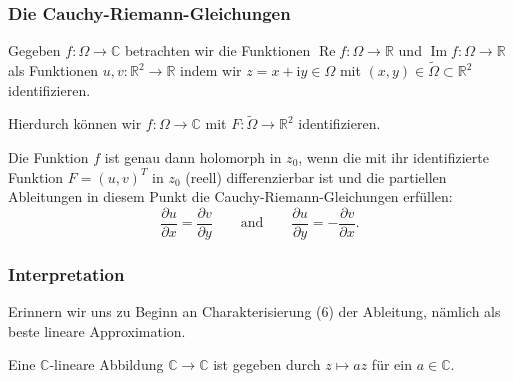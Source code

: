 \documentclass[10pt]{beamer}
\newcommand{\iu}{\mathrm{i}}
\renewcommand{\Re}{\operatorname{Re}}
\renewcommand{\Im}{\operatorname{Im}}
\begin{document}
\begin{frame}
	\frametitle{Die Cauchy-Riemann-Gleichungen}
	Gegeben $f \colon \Omega \to \mathbb{C}$ betrachten wir die Funktionen $\Re f \colon \Omega \to \mathbb{R}$ und $\Im f \colon \Omega \to \mathbb{R}$ als Funktionen $u, v \colon \mathbb{R}^2 \to \mathbb{R}$ indem wir $z = x + \iu y \in \Omega$ mit $(x, y) \in \tilde{\Omega} \subset \mathbb{R}^2$ identifizieren.
	\pause

	Hierdurch können wir $f \colon \Omega \to \mathbb{C}$ mit $F \colon \tilde{\Omega} \to \mathbb{R}^2$ identifizieren.
	\pause
	\begin{theorem}
		Die Funktion $f$ ist genau dann holomorph in $z_0$, wenn die mit ihr identifizierte Funktion $F = (u, v)^T$ in $z_0$ (reell) differenzierbar ist und die partiellen Ableitungen in diesem Punkt die Cauchy-Riemann-Gleichungen erfüllen:
		\[
			\frac{\partial u}{\partial x} = \frac{\partial v}{\partial y} \qquad \text{and} \qquad \frac{\partial u}{\partial y} = - \frac{\partial v}{\partial x}.
		\]
	\end{theorem}
\end{frame}
\begin{frame}
	\frametitle{Interpretation}
	Erinnern wir uns zu Beginn an Charakterisierung (6) der Ableitung, nämlich als beste lineare Approximation.
	\pause

	Eine $\mathbb{C}$-lineare Abbildung $\mathbb{C} \to \mathbb{C}$ ist gegeben durch $z \mapsto a z$ für ein $a \in \mathbb{C}$.
\end{frame}
\end{document}
